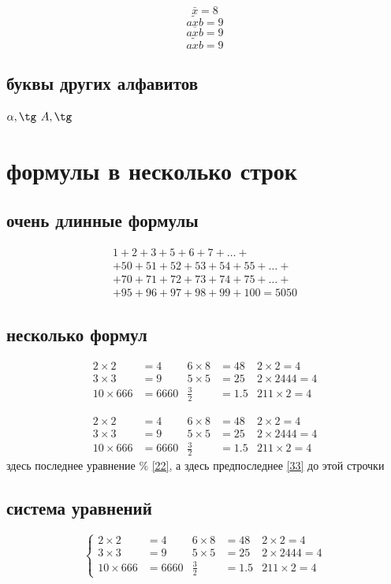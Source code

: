 \documentclass[a4paper,12pt]{article} %
\begin{document}
\[\bar x=8\]
\[\tilde{axb} = 9\]
\[\overline{axb} = 9\]
\[\widetilde{axb} = 9\]
\subsection{буквы других алфавитов}
$\alpha,\tg$ 
$A, \tg$ 

\section{формулы в несколько строк} 
\subsection{очень длинные формулы}

\begin{multline}
1+2+3+5+6+7+\dots+\\+50+51+52+53+54+55+\dots+\\+70+71+72+73+74+75+\dots+\\+95+96+97+98+99+100  =  5050 \tag{S}\label{SUM}
\end{multline}

\subsection{несколько формул}


\begin{align} \label{33}
2\times 2 &= 4 &6\times 8 &= 48 & 2\times 2 = 4\\ 
3\times 3  &=9 &5\times 5 &= 25 & 2\times 2444 = 4\\
10 \times 666 &= 6660 &\frac {3}{2} &= 1.5 & 211\times 2 = 4
\end{align}

\begin{equation}\label{22}
\begin{aligned}
2\times 2 &= 4 &6\times 8 &= 48 & 2\times 2 = 4\\
3\times 3  &=9 &5\times 5 &= 25 & 2\times 2444 = 4\\
10 \times 666 &= 6660 &\frac {3}{2} &= 1.5 & 211\times 2 = 4	
\end{aligned}
\end{equation}
здесь последнее уравнение \% \eqref{22}, а здесь предпоследнее \eqref{33} до этой строчки 

\subsection{система уравнений}
\[\left\{
\begin{aligned}
2\times 2 &= 4 &6\times 8 &= 48 & 2\times 2 = 4\\
3\times 3  &=9 &5\times 5 &= 25 & 2\times 2444 = 4\\
10 \times 666 &= 6660 &\frac {3}{2} &= 1.5 & 211\times 2 = 4	
\end{aligned}\right.
\]

\tableofcontents
\end{document}

